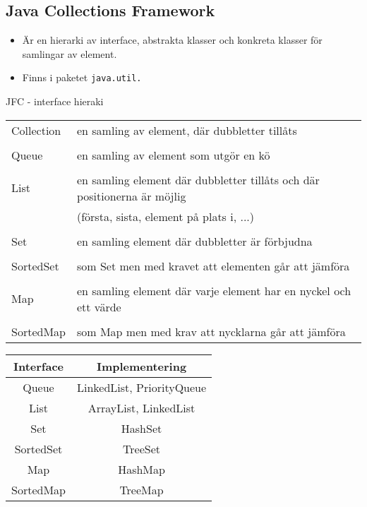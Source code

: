 \documentclass[11pt]{article}
\begin{document}
\subsection{Java Collections Framework}
\begin{itemize}
\item{Är en hierarki av interface, abstrakta klasser och konkreta klasser för samlingar av element.}
\item{Finns i paketet \verb+java.util.+}
\end{itemize}

\begin{center}
JFC - interface hieraki
\end{center}
\begin{tabular}{l|l}
	Collection	&	en samling av element, där dubbletter tillåts \\ \\
	Queue		&	en samling av element som utgör en kö	 \\ \\
	List		&	en samling element där dubbletter tillåts och där positionerna är möjlig \\
				&	(första, sista, element på plats i, ...) \\	\\
	Set			&	en samling element där dubbletter är förbjudna \\ \\
	SortedSet	&	som Set men med kravet att elementen går att jämföra \\ \\
	Map			&	en samling element där varje element har en nyckel och ett värde \\ \\
	SortedMap	&	som Map men med krav att nycklarna går att jämföra
\end{tabular}	

\begin{center}
\begin{tabular}{|c|c|}
	\hline
	Interface	&	Implementering \\
	\hline
	Queue		&	LinkedList, PriorityQueue \\
	List		&	ArrayList, LinkedList \\
	Set			&	HashSet \\
	SortedSet	&	TreeSet	\\
	Map			&	HashMap \\
	SortedMap	&	TreeMap \\
	\hline
\end{tabular}
\end{center}
\end{document}
